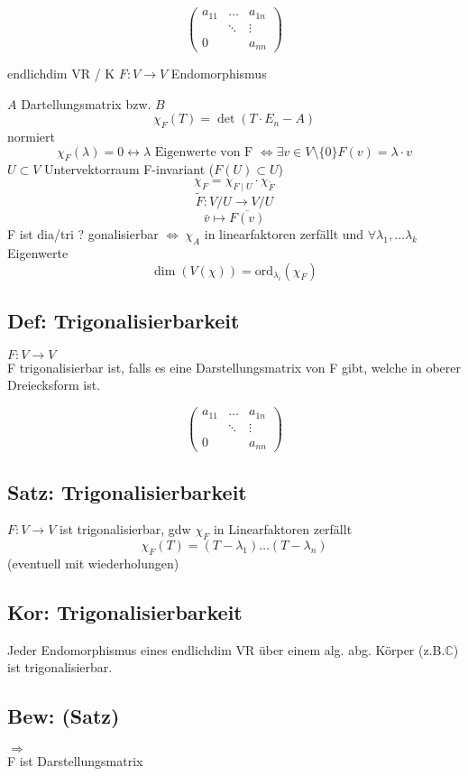 \documentclass[titlepage,12pt,a4paper,ngerman]{report}
\newcommand{\ov}[1]{\overline{#1}}
\begin{document}
$$\begin{pmatrix}
a_{11} & \dots & a_{1n} \\
& \ddots & \vdots\\
0 & & a_{nn}
\end{pmatrix}$$



endlichdim VR / K
$F: V \to V $ Endomorphismus

$ A $ Dartellungsmatrix bzw. $B$
$$ \chi_F (T) = \det (T\cdot E_n - A)$$
normiert
$$\chi_F(\lambda) = 0 \leftrightarrow \lambda \textrm{ Eigenwerte von F } \Leftrightarrow \exists v\in V\setminus \{0\} F(v) = \lambda \cdot v$$
$U \subset V$ Untervektorraum F-invariant ($F(U) \subset U$)
$$\chi_F = \chi_{F \mid U} \cdot \chi_{\tilde{F}}$$
$$ \tilde{F}: V/U \to V/U$$
$$\bar{v} \mapsto \ov{F(v)}$$
F ist dia/tri ? gonalisierbar $\Leftrightarrow \ \chi_A$ in linearfaktoren zerfällt und $\forall \lambda_1, \dots \lambda_k$ Eigenwerte
$$\dim(V(\chi)) = \textrm{ord}_{\lambda_i}(\chi_F)$$
\subsection{Def: Trigonalisierbarkeit}
$F: V\to V $\\
F trigonalisierbar ist, falls es eine Darstellungsmatrix von F gibt, welche in oberer Dreiecksform ist.

$$\begin{pmatrix}
a_{11} & \dots & a_{1n} \\
& \ddots & \vdots\\
0 & & a_{nn}
\end{pmatrix}$$

\subsection{Satz: Trigonalisierbarkeit}
$F: V\to V $
ist trigonalisierbar, gdw $\chi_F$ in Linearfaktoren zerfällt 
$$\chi_F(T) = (T-\lambda_1) \dots (T-\lambda_n)$$
(eventuell mit wiederholungen)
\subsection{Kor:  Trigonalisierbarkeit}
Jeder Endomorphismus eines endlichdim VR über einem alg. abg. Körper (z.B.$\mathbb{C}$) ist trigonalisierbar.
\subsection{Bew: (Satz)}
$\Rightarrow$ \\
F ist Darstellungsmatrix 
\end{document}

